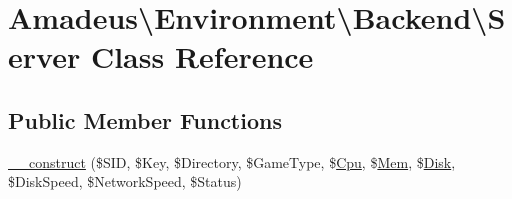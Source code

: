 \hypertarget{classAmadeus_1_1Environment_1_1Backend_1_1Server}{}\section{Amadeus\textbackslash{}Environment\textbackslash{}Backend\textbackslash{}Server Class Reference}
\label{classAmadeus_1_1Environment_1_1Backend_1_1Server}
\subsection*{Public Member Functions}
\begin{DoxyCompactItemize}
\item 
\hyperlink{classAmadeus_1_1Environment_1_1Backend_1_1Server_aa354e220d24e42ae1bb57956ded446f8}{\+\_\+\+\_\+construct} (\$S\+ID, \$Key, \$Directory, \$Game\+Type, \$\hyperlink{classAmadeus_1_1Environment_1_1Cgroup_1_1Cpu}{Cpu}, \$\hyperlink{classAmadeus_1_1Environment_1_1Cgroup_1_1Mem}{Mem}, \$\hyperlink{classAmadeus_1_1Environment_1_1Cgroup_1_1Disk}{Disk}, \$Disk\+Speed, \$Network\+Speed, \$Status)
\end{DoxyCompactItemize}
